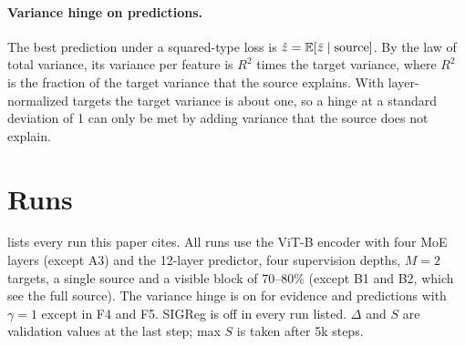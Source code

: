 \paragraph{Variance hinge on predictions.} The best prediction under a squared-type loss is $\hat z = \operatorname*{\mathbb{E}}[\bar z \mid \text{source}]$. By the law of total variance, its variance per feature is $R^2$ times the target variance, where $R^2$ is the fraction of the target variance that the source explains. With layer-normalized targets the target variance is about one, so a hinge at a standard deviation of 1 can only be met by adding variance that the source does not explain.

\section{Runs}
\label{sec:supp_runs}

 lists every run this paper cites. All runs use the ViT-B encoder with four MoE layers (except A3) and the 12-layer predictor, four supervision depths, $M{=}2$ targets, a single source and a visible block of 70--80\% (except B1 and B2, which see the full source). The variance hinge is on for evidence and predictions with $\gamma{=}1$ except in F4 and F5. SIGReg is off in every run listed. $\Delta$ and $S$ are validation values at the last step; max $S$ is taken after 5k steps.

